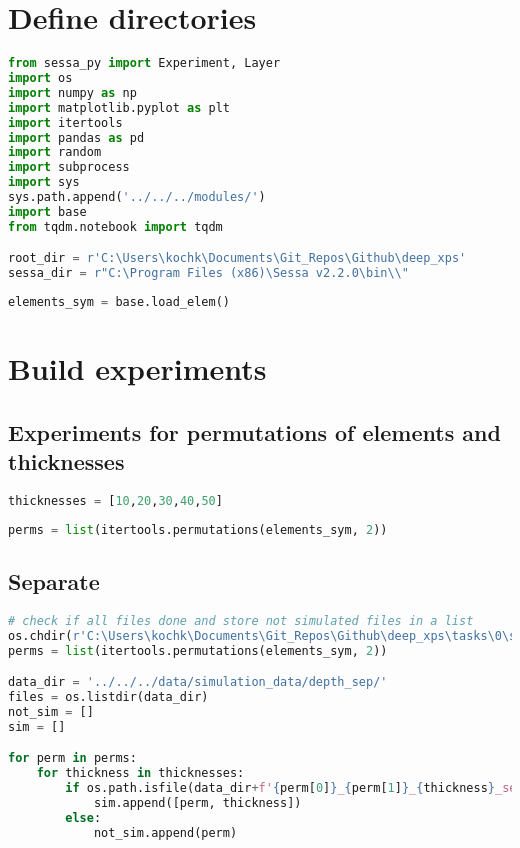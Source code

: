 \hypertarget{define-directories}{%
\section*{Define directories}\label{define-directories}}

\begin{lstlisting}[language=Python]
from sessa_py import Experiment, Layer
import os
import numpy as np
import matplotlib.pyplot as plt
import itertools
import pandas as pd
import random
import subprocess
import sys
sys.path.append('../../../modules/')
import base
from tqdm.notebook import tqdm

root_dir = r'C:\Users\kochk\Documents\Git_Repos\Github\deep_xps'
sessa_dir = r"C:\Program Files (x86)\Sessa v2.2.0\bin\\"
\end{lstlisting}

\begin{lstlisting}[language=Python]
elements_sym = base.load_elem()
\end{lstlisting}

\hypertarget{build-experiments}{%
\section*{Build experiments}\label{build-experiments}}

\hypertarget{experiments-for-permutations-of-elements-and-thicknesses}{%
\subsection*{Experiments for permutations of elements and
thicknesses}\label{experiments-for-permutations-of-elements-and-thicknesses}}

\begin{lstlisting}[language=Python]
thicknesses = [10,20,30,40,50]
\end{lstlisting}

\begin{lstlisting}[language=Python]
perms = list(itertools.permutations(elements_sym, 2))
\end{lstlisting}

\hypertarget{separate}{%
\subsection*{Separate}\label{separate}}

\begin{lstlisting}[language=Python]
# check if all files done and store not simulated files in a list
os.chdir(r'C:\Users\kochk\Documents\Git_Repos\Github\deep_xps\tasks\0\simulation')
perms = list(itertools.permutations(elements_sym, 2))

data_dir = '../../../data/simulation_data/depth_sep/'
files = os.listdir(data_dir)
not_sim = []
sim = []

for perm in perms:
    for thickness in thicknesses:
        if os.path.isfile(data_dir+f'{perm[0]}_{perm[1]}_{thickness}_separate_spectra.spcreg1.spc'):
            sim.append([perm, thickness])
        else:
            not_sim.append(perm)
\end{lstlisting}

